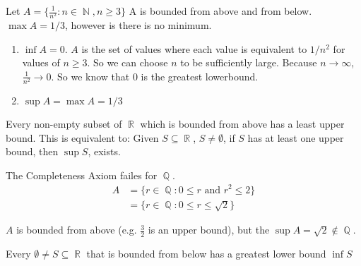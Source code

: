 \documentclass[a4paper, 11pt]{article}
\DeclareMathOperator{\N}{\mathbb{N}}
\DeclareMathOperator{\R}{\mathbb{R}}
\DeclareMathOperator{\Q}{\mathbb{Q}}
\begin{document}
\begin{example}
Let $A = \lbrace \frac{1}{n^{2}}: n \in \N, n\geq 3  \rbrace$ A is bounded from above and from below.
$\max A = 1 / 3$, however is there is no minimum.

\begin{enumerate}
  \item $\inf A = 0$. $A$ is the set of values where each value is equivalent to $1/n^2$ for values of 
  $n\geq 3$. So we can choose $n$ to be sufficiently large. Because $n \rightarrow \infty$,
  $\frac{1}{n^2} \rightarrow 0$. So we know that 0 is the greatest lowerbound.
  \item $\sup A = \max A = 1/3$
\end{enumerate}
\end{example}

\begin{definition}
Every non-empty subset of $\R$ which is bounded from above has a least upper bound. This is equivalent
to: Given $S \subseteq \R$, $S \neq \emptyset$, if $S$ has at least one upper bound, then $\sup S$, exists.
\end{definition}

\begin{remark}
The Completeness Axiom failes for $\Q$.
\begin{align*}
  A &= \lbrace r \in \Q: 0 \leq r \text{ and } r^2 \leq 2 \rbrace \\
  &= \lbrace r \in \Q: 0 \leq r \leq \sqrt{2} \rbrace 
\end{align*}
\end{remark}
$A$ is bounded from above (e.g. $\frac{3}{2}$ is an upper bound), but the $\sup A = \sqrt{2}\not\in \Q$.

\begin{corollary}
Every $\emptyset \neq S \subseteq \R$ that is bounded from below has a greatest lower bound $\inf S$
\end{corollary}
\end{document}
